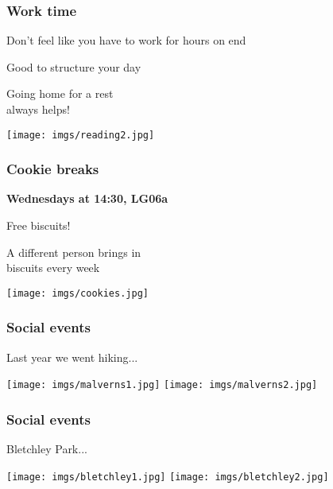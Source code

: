 \begin{frame}
    \frametitle{Work time}
    \centering
    \begin{minipage}{0.4\textwidth}
        \centering
        \Large

        Don't feel like you have to work
        for hours on end

        \vspace{1em}

        Good to \alert{structure} your day

        \vspace{1em}

        Going home for a rest \\
        always helps!
    \end{minipage}
    \qquad
    \begin{minipage}{0.4\textwidth}
        \texttt{[image: imgs/reading2.jpg]}
    \end{minipage}
\end{frame}
\begin{frame}
    \frametitle{Cookie breaks}
    \centering

    \textbf{\LARGE Wednesdays at 14:30, LG06a}

    \vspace{1em}

    \begin{minipage}{0.4\textwidth}
        \centering
        \Large

        \alert{Free biscuits!}

        \vspace{1em}

        A different person brings in \\
        biscuits every week
    \end{minipage}
    \qquad
    \begin{minipage}{0.4\textwidth}
        \texttt{[image: imgs/cookies.jpg]}
    \end{minipage}
\end{frame}
\begin{frame}
    \frametitle{Social events}
    \centering

    \Large
    Last year we went hiking...

    \vspace{1em}

    \texttt{[image: imgs/malverns1.jpg]}
    \texttt{[image: imgs/malverns2.jpg]}


\end{frame}
\begin{frame}
    \frametitle{Social events}
    \centering

    \Large
    Bletchley Park...

    \vspace{1em}

    \texttt{[image: imgs/bletchley1.jpg]}
    \texttt{[image: imgs/bletchley2.jpg]}

\end{frame}

